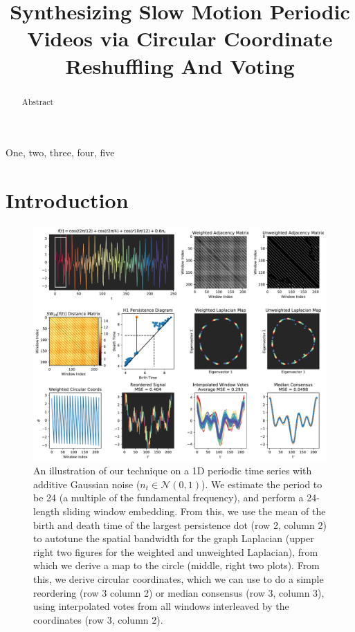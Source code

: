 \documentclass{article}
\title{Synthesizing Slow Motion Periodic Videos via Circular Coordinate Reshuffling And Voting}
\begin{document}
%
\maketitle
%


\begin{abstract}
Abstract
\end{abstract}
%
\begin{keywords}
One, two, three, four, five
\end{keywords}
%


\section{Introduction}

\begin{figure}[h!]
\centering
\includegraphics[width=\columnwidth]{1DExample.pdf}
\caption{An illustration of our technique on a 1D periodic time series with additive Gaussian noise ($n_t \in \mathcal{N}(0, 1)$).  We estimate the period to be 24 (a multiple of the fundamental frequency), and perform a 24-length sliding window embedding.  From this, we use the mean of the birth and death time of the largest persistence dot (row 2, column 2) to autotune the spatial bandwidth for the graph Laplacian (upper right two figures for the weighted and unweighted Laplacian), from which we derive a map to the circle (middle, right two plots).  From this, we derive circular coordinates, which we can use to do a simple reordering (row 3 column 2) or median consensus (row 3, column 3), using interpolated votes from all windows interleaved by the coordinates (row 3, column 2). }
\label{fig:ConceptFigure}
\end{figure}
\end{document}
